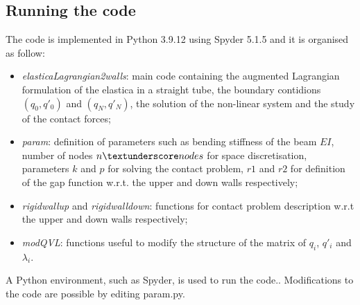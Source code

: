 \subsection{Running the code}

The code is implemented in Python 3.9.12 using Spyder 5.1.5 and it is organised as follow: \begin{itemize}
	\item \textit{elastica\textunderscore Lagrangian\textunderscore 2walls}: main code containing the augmented Lagrangian formulation of the elastica in a straight tube, the boundary contidions $(q_0,q'_0)$ and $(q_N, q'_N)$, the solution of the non-linear system and the study of the contact forces;
	\item \textit{param}: definition of parameters such as bending stiffness of the beam $EI$, number of nodes $n\textunderscore nodes$ for space discretisation, parameters $k$ and $p$ for solving the contact problem, $r1$ and $r2$ for definition of the gap function w.r.t. the upper and down walls respectively;
	\item \textit{rigid\textunderscore wall\textunderscore up} and \textit{rigid\textunderscore wall\textunderscore down}: functions for contact problem description w.r.t the upper and down walls respectively;
	\item \textit{mod\textunderscore QVL}: functions useful to modify the structure of the matrix of $q_i$, $q'_i$ and $\lambda_i$.  
\end{itemize}

A Python environment, such as Spyder, is used to run the code.. Modifications to the code are possible by editing param.py.




